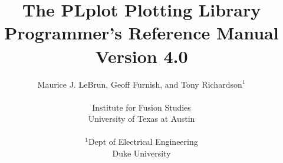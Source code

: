 \newenvironment{ename}{\list{}{\setlength{\leftmargin}{0pc}}\item[]}{\endlist}
\newenvironment{edescr}{\list{}{\setlength{\leftmargin}{4pc}
\setlength{\topsep}{0pc}}\item[]}{\endlist}
\newenvironment{eargn}{\list{}{\setlength{\leftmargin}{2pc}}\item[]}{\endlist}
\newenvironment{eargd}{\list{}{\setlength{\leftmargin}{2pc}
\setlength{\topsep}{0pc}\setlength{\parskip}{0pc}}\item[]}{\endlist}
\newcommand{\name}[1]{\begin{ename}{\tt #1}\end{ename}}
\newcommand{\bname}[1]{\pagebreak[2]\begin{ename}{\fbox{\tt #1}}\end{ename}\nopagebreak}
\newcommand{\bnameC}[1]{\pagebreak[2]\begin{ename}{\fbox{\tt #1}\qquad(C)}\end{ename}\nopagebreak}
\newcommand{\bnameF}[1]{\pagebreak[2]\begin{ename}{\fbox{\tt #1}\qquad(Fortran)}\end{ename}\nopagebreak}
\newcommand{\bnameCF}[4]{\pagebreak[2]\begin{ename}
	{\fbox{\tt#1}{\qquad#2}}\\{\fbox{\tt#3}{\qquad#4}}\end{ename}\nopagebreak}
\newcommand{\descr}[1]{\begin{edescr}#1\end{edescr}}
\newcommand{\argu}[2]{\pagebreak[2]\begin{eargn}#1:\nopagebreak\begin{eargd}#2\end{eargd}\end{eargn}}
\newcommand{\rou}[1]{{\tt #1} (page~\pageref{#1})}
\setlength{\textheight}{23 cm}
\setlength{\textwidth}{16 cm}
\setlength{\oddsidemargin}{0 cm}
\setlength{\evensidemargin}{\oddsidemargin}
\setlength{\topmargin}{-1.5 cm}



\title{ The PLplot Plotting Library \\ 
	Programmer's Reference Manual \\
	Version 4.0}
\author{
	Maurice J. LeBrun, 
	Geoff Furnish, and
	Tony Richardson$^1$\\
\\
	Institute for Fusion Studies\\
	University of Texas at Austin\\
	\\
	$^1$Dept of Electrical Engineering\\
	Duke University\\
	}

